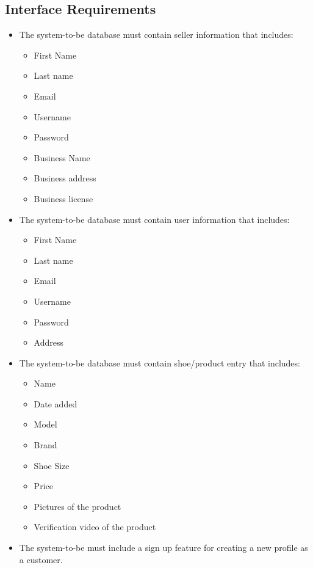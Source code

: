 \subsection{Interface Requirements}
\begin{itemize}
  \item The system-to-be database must contain seller information that includes:
        \begin{itemize}
          \item First Name
          \item Last name
          \item Email
          \item Username
          \item Password
          \item Business Name
          \item Business address
          \item Business license
        \end{itemize}
  \item The system-to-be database must contain user information that includes:
        \begin{itemize}
          \item First Name
          \item Last name
          \item Email
          \item Username
          \item Password
          \item Address
        \end{itemize}
  \item The system-to-be database must contain shoe/product entry that includes:
        \begin{itemize}
          \item Name
          \item Date added
          \item Model
          \item Brand
          \item Shoe Size
          \item Price
          \item Pictures of the product
          \item Verification video of the product
        \end{itemize}
  \item The system-to-be must include a sign up feature for creating a new profile as a customer.

\end{itemize}
